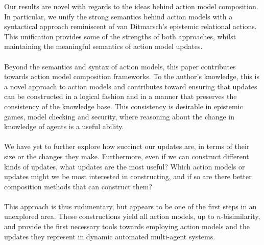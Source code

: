 Our results are novel with regards to the ideas behind action model composition.
In particular, we unify the strong semantics behind action models with a syntactical approach reminiscent of van
Ditmarsch's \cite{ditmarsch2002dga} epistemic relational actions.
This unification provides some of the strengths of both approaches, whilst maintaining the
meaningful semantics of action model updates.\\
\\
Beyond the semantics and syntax of action models, this paper contributes towards action model
composition frameworks.
To the author's knowledge, this is a novel approach to action models and contributes toward ensuring
that updates can be constructed in a logical fashion and in a manner that preserves the consistency
of the knowledge base.
This consistency is desirable in epistemic games, model checking and security, where reasoning about
the change in knowledge of agents is a useful ability.\\
\\
We have yet to further explore how succinct our updates are, in terms of their size or the changes
they make.
Furthermore, even if we can construct different kinds of updates, what updates are the most useful?
Which action models or updates might we be most interested in constructing, and if so are there
better composition methods that can construct them?\\
\\
This approach is thus rudimentary, but appears to be one of the first steps in an unexplored area.
These constructions yield all action models, up to $n$-bisimilarity, and provide the first necessary
tools towards employing action models and the updates they represent in dynamic automated
multi-agent systems.
% 
% 
% 
